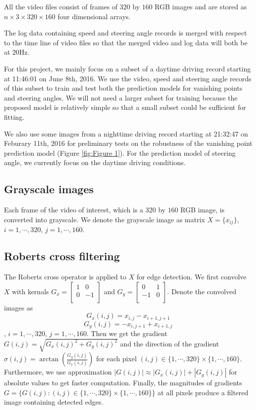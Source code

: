 \documentclass[11pt, oneside]{article}
\begin{document}
All the video files consist of frames of $320$ by $160$ RGB images and are stored as $n\times 3\times 320 \times 160$ four dimensional arrays. 

The log data containing speed and steering angle records is merged with respect to the time line of video files so that the merged video and log data will both be at 20Hz. 

For this project, we mainly focus on a subset of a daytime driving record starting at 11:46:01 on June 8th, 2016. We use the video, speed and steering angle records of this subset to train and test both the prediction models for vanishing points and steering angles. We will not need a larger subset for training because the proposed model is relatively simple so that a small subset could be sufficient for fitting. 

We also use some images from a nighttime driving record starting at 21:32:47 on Feburary 11th, 2016 for preliminary tests on the robustness  of the vanishing point prediction model (Figure \ref{fig:Figure 1}). For the prediction model of steering angle, we currently focus on the daytime driving conditions. 


\subsection*{Grayscale images}

Each frame of the video of interest, which is a $320$ by $160$ RGB image, is converted into grayscale. We denote the grayscale image as matrix 
$X = \{x_{ij}\}$, $i = 1, \cdots, 320$, $j = 1, \cdots, 160$. 

\subsection*{Roberts cross filtering}

The Roberts cross operator is applied to $X$ for edge detection. We first convolve $X$ with kernals $G_x = 
\begin{bmatrix}
1 & 0 \\
0 & -1 \\
\end{bmatrix}
$ 
and $G_y = 
\begin{bmatrix}
0 & 1 \\
-1 & 0 \\
\end{bmatrix}
$. Denote the convolved images as 
$$G_x(i, j) = x_{i, j} - x_{i+1, j+1}
$$
$$G_y(i, j) = - x_{i, j+1} + x_{i+1, j}
$$, $i = 1, \cdots, 320$, $j = 1, \cdots, 160$. Then we get the gradient 
$G(i, j) = \sqrt{G_x(i,j)^2 + G_y(i,j)^2}$ and the direction of the gradient $\sigma(i,j) = \arctan (\frac{G_y(i,j)}{G_x(i,j)})$ for each pixel $(i,j) \in \{1, \cdots, 320\} \times \{1, \cdots, 160\}$. Furthermore,  we use approximation 
$|G(i, j)| \approx |G_x(i,j)| + |G_y(i,j)|$ for absolute values to get faster computation. Finally, the magnitudes of gradients $G = \{G(i, j): (i, j) \in \{1, \cdots, 320\} \times \{1, \cdots, 160\} \}$ at all pixels produce a filtered image containing detected edges. 
\end{document}
